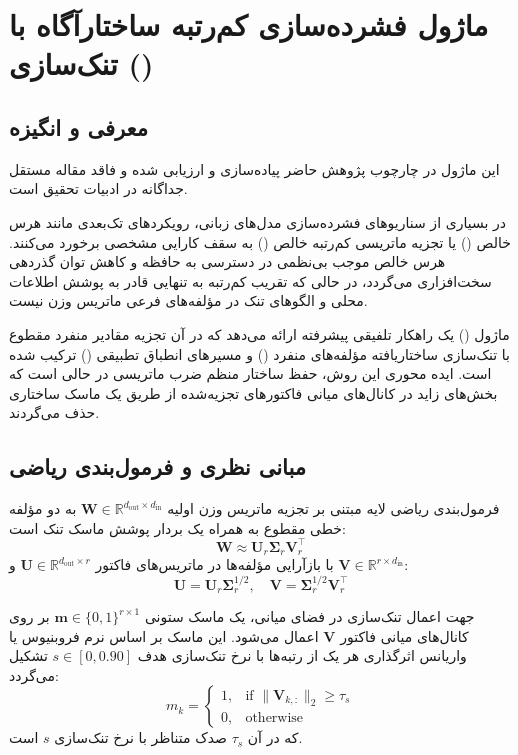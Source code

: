 \section{ماژول فشرده‌سازی کم‌رتبه ساختارآگاه با تنک‌سازی ()}
\label{sec:salr}

\subsection{معرفی و انگیزه}
این ماژول در چارچوب پژوهش حاضر پیاده‌سازی و ارزیابی شده و فاقد مقاله مستقل جداگانه در ادبیات تحقیق است.

در بسیاری از سناریوهای فشرده‌سازی مدل‌های زبانی، رویکردهای تک‌بعدی مانند هرس خالص () یا تجزیه ماتریسی کم‌رتبه خالص () به سقف کارایی مشخصی برخورد می‌کنند. هرس خالص موجب بی‌نظمی در دسترسی به حافظه و کاهش توان گذردهی سخت‌افزاری می‌گردد، در حالی که تقریب کم‌رتبه به تنهایی قادر به پوشش اطلاعات محلی و الگوهای تنک در مؤلفه‌های فرعی ماتریس وزن نیست.

ماژول  () یک راهکار تلفیقی پیشرفته ارائه می‌دهد که در آن تجزیه مقادیر منفرد مقطوع با تنک‌سازی ساختاریافته مؤلفه‌های منفرد () و مسیرهای انطباق تطبیقی () ترکیب شده است. ایده محوری این روش، حفظ ساختار منظم ضرب ماتریسی در حالی است که بخش‌های زاید در کانال‌های میانی فاکتورهای تجزیه‌شده از طریق یک ماسک ساختاری حذف می‌گردند.

\subsection{مبانی نظری و فرمول‌بندی ریاضی}
فرمول‌بندی ریاضی لایه  مبتنی بر تجزیه ماتریس وزن اولیه $\mathbf{W} \in \mathbb{R}^{d_{\text{out}} \times d_{\text{in}}}$ به دو مؤلفه خطی مقطوع به همراه یک بردار پوشش ماسک تنک است:
\begin{equation}
\mathbf{W} \approx \mathbf{U}_r \mathbf{\Sigma}_r \mathbf{V}_r^\top
\end{equation}
با بازآرایی مؤلفه‌ها در ماتریس‌های فاکتور $\mathbf{U} \in \mathbb{R}^{d_{\text{out}} \times r}$ و $\mathbf{V} \in \mathbb{R}^{r \times d_{\text{in}}}$:
\begin{equation}
\mathbf{U} = \mathbf{U}_r \mathbf{\Sigma}_r^{1/2}, \quad \mathbf{V} = \mathbf{\Sigma}_r^{1/2} \mathbf{V}_r^\top
\end{equation}

جهت اعمال تنک‌سازی در فضای میانی، یک ماسک ستونی $\mathbf{m} \in \{0, 1\}^{r \times 1}$ بر روی کانال‌های میانی فاکتور $\mathbf{V}$ اعمال می‌شود. این ماسک بر اساس نرم فروبنیوس یا واریانس اثرگذاری هر یک از رتبه‌ها با نرخ تنک‌سازی هدف $s \in [0, 0.90]$ تشکیل می‌گردد:
\begin{equation}
m_k = \begin{cases}
1, & \text{if } \|\mathbf{V}_{k, :}\|_2 \ge \tau_s \\
0, & \text{otherwise}
\end{cases}
\end{equation}
که در آن $\tau_s$ صدک متناظر با نرخ تنک‌سازی $s$ است.


